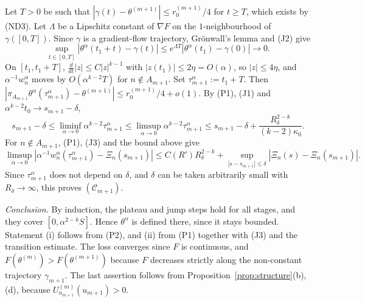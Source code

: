 \documentclass[11pt]{article}
\theoremstyle{definition}
\theoremstyle{remark}
\numberwithin{equation}{section}
\newcommand{\ND}[1]{\textup{(ND#1)}}
\begin{document}
Let $T>0$ be such that $|\gamma(t)-\theta^{(m+1)}|\le r_0^{(m+1)}/4$ for $t\ge T$, which exists by \ND3. Let $\Lambda$ be a Lipschitz constant of $\nabla F$ on the $1$-neighbourhood of $\gamma([0,T])$. Since $\gamma$ is a gradient-flow trajectory, Grönwall's lemma and (J2) give
\[
\sup_{t\in[0,T]}|\theta^\alpha(t_1+t)-\gamma(t)|\le e^{\Lambda T}|\theta^\alpha(t_1)-\gamma(0)|\to0 .
\]
On $[t_1,t_1+T]$, $\frac{d}{dt}|z|\le C|z|^{k-1}$ with $|z(t_1)|\le2\eta=O(\alpha)$, so $|z|\le4\eta$, and $\alpha^{-1}w_n^\alpha$ moves by $O(\alpha^{k-2}T)$ for $n\notin A_{m+1}$. Set $\tau_{m+1}^\alpha:=t_1+T$. Then $|\pi_{A_{m+1}}\theta^\alpha(\tau^\alpha_{m+1})-\theta^{(m+1)}|\le r_0^{(m+1)}/4+o(1)$. By (P1), (J1) and $\alpha^{k-2}t_0\to s_{m+1}-\delta$,
\[
s_{m+1}-\delta\le\liminf_{\alpha\to0}\alpha^{k-2}\tau^\alpha_{m+1}\le\limsup_{\alpha\to0}\alpha^{k-2}\tau^\alpha_{m+1}\le s_{m+1}-\delta+\frac{R_\delta^{2-k}}{(k-2)\kappa_0}.
\]
For $n\notin A_{m+1}$, (P1), (J3) and the bound above give
\[
\limsup_{\alpha\to0}|\alpha^{-1}w_n^\alpha(\tau^\alpha_{m+1})-\Xi_n(s_{m+1})|\le C(R')R_\delta^{2-k}+\sup_{|s-s_{m+1}|\le\delta}|\Xi_n(s)-\Xi_n(s_{m+1})|.
\]
Since $\tau^\alpha_{m+1}$ does not depend on $\delta$, and $\delta$ can be taken arbitrarily small with $R_\delta\to\infty$, this proves $(\mathcal C_{m+1})$.

\emph{Conclusion.} By induction, the plateau and jump steps hold for all stages, and they cover $[0,\alpha^{2-k}S]$. Hence $\theta^\alpha$ is defined there, since it stays bounded. Statement (i) follows from (P2), and (ii) from (P1) together with (J3) and the transition estimate. The loss converges since $F$ is continuous, and $F(\theta^{(m)})>F(\theta^{(m+1)})$ because $F$ decreases strictly along the non-constant trajectory $\gamma_{m+1}$. The last assertion follows from Proposition~\ref{prop:structure}(b), (d), because $U^{(m)}_{n_{m+1}}(u_{m+1})>0$.
\end{document}
